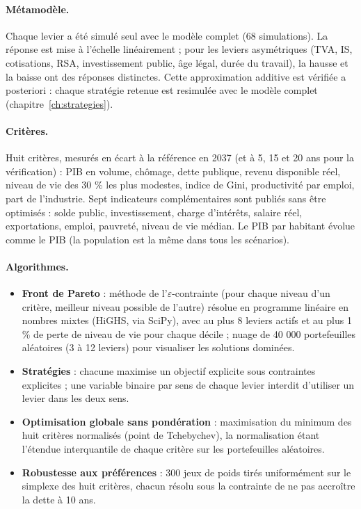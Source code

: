 \paragraph{Métamodèle.} Chaque levier a été simulé seul avec le modèle complet (68 simulations). La réponse est mise à
l'échelle linéairement ; pour les leviers asymétriques (TVA, IS, cotisations, RSA, investissement public, âge légal,
durée du travail), la hausse et la baisse ont des réponses distinctes. Cette approximation additive est vérifiée a
posteriori : chaque stratégie retenue est resimulée avec le modèle complet (chapitre~\ref{ch:strategies}).

\paragraph{Critères.} Huit critères, mesurés en écart à la référence en 2037 (et à 5, 15 et 20 ans pour la
vérification) : PIB en volume, chômage, dette publique, revenu disponible réel, niveau de vie des 30 \% les plus
modestes, indice de Gini, productivité par emploi, part de l'industrie. Sept indicateurs complémentaires sont publiés
sans être optimisés : solde public, investissement, charge d'intérêts, salaire réel, exportations, emploi, pauvreté,
niveau de vie médian. Le PIB par habitant évolue comme le PIB (la population est la même dans tous les scénarios).

\paragraph{Algorithmes.}
\begin{itemize}
\item \textbf{Front de Pareto} : méthode de l'$\varepsilon$-contrainte (pour chaque niveau d'un critère, meilleur
niveau possible de l'autre) résolue en programme linéaire en nombres mixtes (HiGHS, via SciPy), avec au plus
8 leviers actifs et au plus 1 \% de perte de niveau de vie pour chaque décile ; nuage de 40 000 portefeuilles
aléatoires (3 à 12 leviers) pour visualiser les solutions dominées.
\item \textbf{Stratégies} : chacune maximise un objectif explicite sous contraintes explicites ; une variable binaire
par sens de chaque levier interdit d'utiliser un levier dans les deux sens.
\item \textbf{Optimisation globale sans pondération} : maximisation du minimum des huit critères normalisés (point de
Tchebychev), la normalisation étant l'étendue interquantile de chaque critère sur les portefeuilles aléatoires.
\item \textbf{Robustesse aux préférences} : 300 jeux de poids tirés uniformément sur le simplexe des huit critères,
chacun résolu sous la contrainte de ne pas accroître la dette à 10 ans.
\end{itemize}

